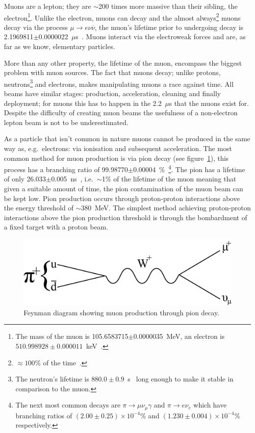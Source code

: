 Muons are a lepton; they are \(\sim\)200 times more massive than their sibling, the electron\footnote{The mass of the muon is 105.6583715\(\pm\)0.0000035~MeV, an electron is \( 510.998928\pm0.000011 \)~keV~\cite{pdg}.}. Unlike the electron, muons can decay and the almost always\footnote{\(\approx100\%\) of the time~\cite{pdg}.} muons decay via the process \(\mu\rightarrow e\nu\overline{\nu}\), the muon's lifetime prior to undergoing decay is 2.1969811\( \pm \)0.0000022~\( \mu \)s~\cite{pdg}. Muons interact via the electroweak forces and are, as far as we know, elementary particles.

More than any other property, the lifetime of the muon, encompass the biggest problem with muon sources. The fact that muons decay; unlike protons, neutrons\footnote{The neutron's lifetime is \(880.0\pm0.9\)~s~\cite{pdg} long enough to make it stable in comparison to the muon.} and electrons, makes manipulating muons a race against time. All beams have similar stages: production, acceleration, cleaning and finally deployment; for muons this has to happen in the 2.2~\(\mu\)s that the muons exist for. Despite the difficulty of creating muon beams the usefulness of a non-electron lepton beam is not to be underestimated.

As a particle that isn't common in nature muons cannot be produced in the same way as, e.g.\ electrons: via ionisation and subsequent acceleration. The most common method for muon production is via pion decay (see figure~\ref{fig:pion_decay_feyman}), this process has a branching ratio of 99.98770$\pm$0.00004~\%~\cite{pdg}\footnote{The next most common decays are \( \pi\rightarrow\mu\nu_{\mu}\gamma \) and \( \pi\rightarrow e \nu_e \) which have branching ratios of \( (2.00\pm0.25)\times10^{-4} \)\% and \( (1.230\pm0.004)\times10^{-4} \)\% respectively.}. The pion has a lifetime of only 26.033\(\pm\)0.005~ns~\cite{pdg}, i.e.\ \( \sim \)1\% of the lifetime of the muon meaning that given a suitable amount of time, the pion contamination of the muon beam can be kept low. Pion production occurs through proton-proton interactions above the energy threshold of \( \sim380 \)~MeV. The simplest method achieving proton-proton interactions above the pion production threshold is through the bombardment of a fixed target with a proton beam.

\begin{figure}[hptb]
  \centering  
    \includegraphics[scale=0.8]{images/pion_decay_feyman.png}
  \caption{Feynman diagram showing muon production through pion decay.}
  \label{fig:pion_decay_feyman}
\end{figure}

